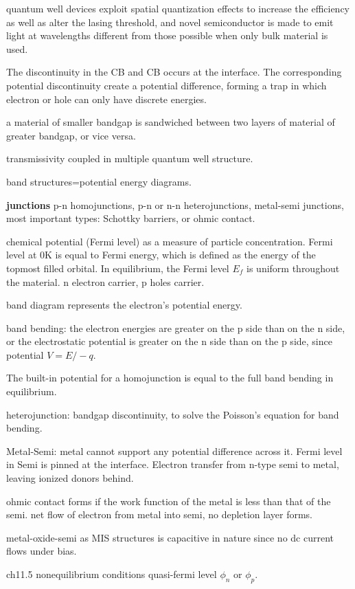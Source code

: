 quantum well devices exploit spatial quantization effects to increase the efficiency as well as alter the lasing threshold, and  novel semiconductor is made to emit light at wavelengths different from those possible when only bulk material is used.


The discontinuity in the CB and CB occurs at the interface. The corresponding potential discontinuity create a potential difference, forming a trap in which electron or hole can only have discrete energies.

a material of smaller bandgap is sandwiched between two layers of material of greater bandgap, or vice versa.

transmissivity coupled in multiple quantum well structure.

band structures=potential energy diagrams.

\textbf{junctions}
p-n homojunctions, p-n or n-n heterojunctions, metal-semi junctions, most important types: Schottky barriers, or ohmic contact.

chemical potential (Fermi level) as a measure of particle concentration.  Fermi level at 0K is equal to Fermi energy, which is defined as the energy of the topmost filled orbital. In equilibrium, the Fermi level $E_f$ is uniform throughout the material. n electron carrier, p holes carrier.

band diagram represents the electron's potential energy.

band bending: the electron energies are greater on the p side than on the n side, or the electrostatic potential is greater on the n side than on the p side, since potential $V = E/-q$.

The built-in potential for a homojunction is equal to the full band bending in equilibrium.

heterojunction: bandgap discontinuity, to solve the Poisson's equation for band bending.

Metal-Semi: metal cannot support any potential difference across it. Fermi level in Semi is pinned at the interface. Electron transfer from n-type semi to metal, leaving ionized donors behind.

ohmic contact forms if the work function of the metal is less than that of the semi. net flow of electron from metal into semi, no depletion layer forms.

metal-oxide-semi as MIS structures is capacitive in nature since no dc current flows under bias.

ch11.5 nonequilibrium conditions
quasi-fermi level $\phi_n$ or $\phi_p$.






























